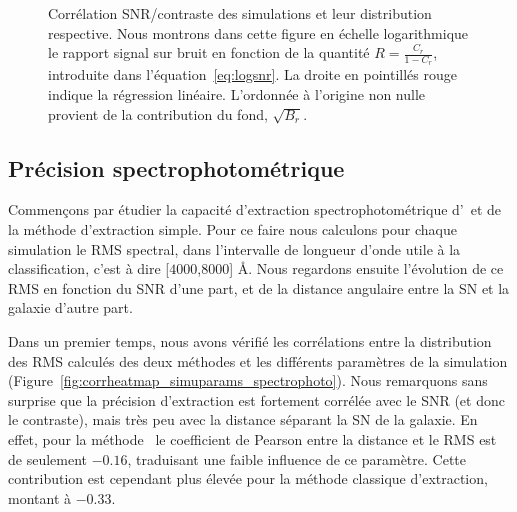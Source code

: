 \documentclass[../main/main.tex]{subfiles}
\begin{document}
\begin{figure}[ht]
  \centering
  \caption[Corrélation SNR/contraste des simulations.]{Corrélation
    SNR/contraste des simulations et leur distribution respective. Nous
    montrons dans cette figure en échelle logarithmique le rapport signal
    sur bruit en fonction de la quantité $R=\frac{C_{r}}{1-C_{r}}$,
    introduite dans l'équation~\ref{eq:logsnr}. La
    droite en pointillés rouge indique la régression
    linéaire. L'ordonnée à l'origine non nulle provient de la
    contribution du fond, $\sqrt{B_{r}}$.}
  \label{fig:corr_SNR_contrast}
\end{figure}

\subsection{Précision spectrophotométrique}\label{ssec:spectrophotoaccuracy}

Commençons par étudier la capacité d'extraction spectrophotométrique d'\hypergal\ et de la méthode
d'extraction simple. Pour ce faire nous calculons pour chaque simulation
le RMS spectral, dans l'intervalle de longueur d'onde utile à la
classification, c'est à dire [$4000$,$8000$] \AA. Nous regardons ensuite
l'évolution de ce RMS en fonction du SNR d'une part, et de la distance
angulaire entre la SN et la galaxie d'autre part.

Dans un premier temps, nous avons vérifié les corrélations entre la
distribution des RMS calculés des deux méthodes et les différents
paramètres de la simulation
(Figure~\ref{fig:corrheatmap_simuparams_spectrophoto}). Nous remarquons
sans surprise
que la précision d'extraction est fortement corrélée avec le SNR (et
donc le contraste), mais très peu avec la distance séparant la SN de la
galaxie. En effet, pour la méthode \hypergal\ le coefficient de Pearson
entre la distance et le RMS est de seulement $-0.16$, traduisant une
faible influence de ce paramètre. Cette contribution est cependant plus
élevée pour la méthode classique d'extraction, montant à $-0.33$.
\end{document}
